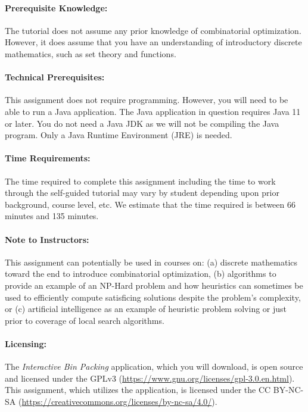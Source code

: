 \documentclass[11pt,letterpaper]{article}
\begin{document}
\paragraph*{Prerequisite Knowledge:} The tutorial does not assume
any prior knowledge of combinatorial optimization. However, it does 
assume that you have an understanding of introductory discrete mathematics,
such as set theory and functions.

\paragraph*{Technical Prerequisites:} This assignment does not require
programming. However, you will need to be able to run a Java application.
The Java application in question requires Java 11 or later. You do not need
a Java JDK as we will not be compiling the Java program. Only a Java Runtime
Environment (JRE) is needed.

\paragraph*{Time Requirements:} The time required to complete this assignment
including the time to work through the self-guided tutorial may vary by
student depending upon prior background, course level, etc. We estimate that
the time required is between 66 minutes and 135 minutes.

\paragraph*{Note to Instructors:} This assignment can potentially be used
in courses on: (a) discrete mathematics toward the end to introduce 
combinatorial optimization, (b) algorithms to provide an example of an
NP-Hard problem and how heuristics can sometimes be used to efficiently
compute satisficing solutions despite the problem's complexity, or (c)
artificial intelligence as an example of heuristic problem solving or
just prior to coverage of local search algorithms.

\paragraph*{Licensing:} The {\em Interactive Bin Packing} application,
which you will download, is open source and licensed under the GPLv3 
(\url{https://www.gnu.org/licenses/gpl-3.0.en.html}). This assignment,
which utilizes the application, is licensed under the CC BY-NC-SA
(\url{https://creativecommons.org/licenses/by-nc-sa/4.0/}). 
\end{document}
